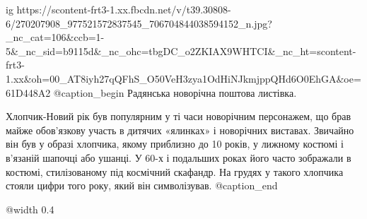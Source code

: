  
 
 
 
 

\ifcmt
  ig https://scontent-frt3-1.xx.fbcdn.net/v/t39.30808-6/270207908_977521572837545_706704844038594152_n.jpg?_nc_cat=106&ccb=1-5&_nc_sid=b9115d&_nc_ohc=tbgDC_o2ZKIAX9WHTCI&_nc_ht=scontent-frt3-1.xx&oh=00_AT8iyh27qQFhS_O50VeH3zya1OdHiNJkmjppQHd6O0EhGA&oe=61D448A2
  @caption_begin
    Радянська новорічна поштова листівка.

    Хлопчик-Новий рік був популярним у ті часи новорічним персонажем, що брав майже
    обов’язкову участь в дитячих «ялинках» і новорічних виставах. Звичайно він був
    у образі хлопчика, якому приблизно до 10 років, у лижному костюмі і в’язаній
    шапочці або ушанці. У 60-х і подальших роках його часто зображали в костюмі,
    стилізованому під космічний скафандр. На грудях у такого хлопчика стояли цифри
    того року, який він символізував.
  @caption_end

  @width 0.4
\fi

